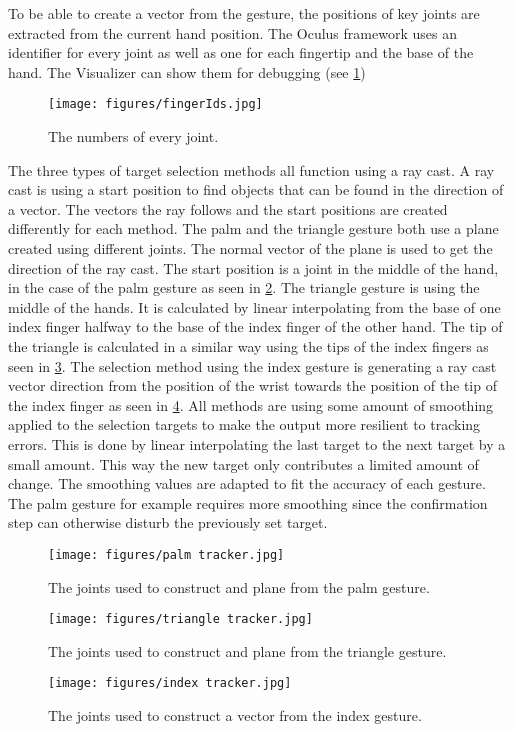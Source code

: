 To be able to create a vector from the gesture, the positions of key joints are extracted from the current hand position. The Oculus framework uses an identifier for every joint as well as one for each fingertip and the base of the hand. The Visualizer can show them for debugging (see \ref{fig:fingerIds})

\begin{figure}[!h]
    \centering
    \texttt{[image: figures/fingerIds.jpg]}
    \caption{The numbers of every joint.}
    \label{fig:fingerIds}
\end{figure}


The three types of target selection methods all function using a ray cast. A ray cast is using a start position to find objects that can be found in the direction of a vector. The vectors the ray follows and the start positions are created differently for each method. 
The palm and the triangle gesture both use a plane created using different joints. The normal vector of the plane is used to get the direction of the ray cast. The start position is a joint in the middle of the hand, in the case of the palm gesture as seen in \ref{fig:palmTracker}. The triangle gesture is using the middle of the hands. It is calculated by linear interpolating from the base of one index finger halfway to the base of the index finger of the other hand. The tip of the triangle is calculated in a similar way using the tips of the index fingers as seen in \ref{fig:triangleTracker}. The selection method using the index gesture is generating a ray cast vector direction from the position of the wrist towards the position of the tip of the index finger as seen in \ref{fig:indexTracker}. All methods are using some amount of smoothing applied to the selection targets to make the output more resilient to tracking errors. This is done by linear interpolating the last target to the next target by a small amount. This way the new target only contributes a limited amount of change. The smoothing values are adapted to fit the accuracy of each gesture. The palm gesture for example requires more smoothing since the confirmation step can otherwise disturb the previously set target.

\begin{figure}[!h]
    \centering
    \texttt{[image: figures/palm tracker.jpg]}
    \caption{The joints used to construct and plane from the palm gesture.}
    \label{fig:palmTracker}
\end{figure}
\begin{figure}[!h]
    \centering
    \texttt{[image: figures/triangle tracker.jpg]}
    \caption{The joints used to construct and plane from the triangle gesture.}
    \label{fig:triangleTracker}
\end{figure}
\begin{figure}[!h]
    \centering
    \texttt{[image: figures/index tracker.jpg]}
    \caption{The joints used to construct a vector from the index gesture.}
    \label{fig:indexTracker}
\end{figure}

